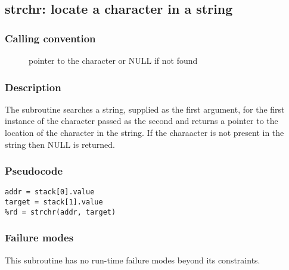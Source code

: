 \clearpage
{}
{}
\label{subr:strchr}
\subsection*{strchr: locate a character in a string}

\subsubsection*{Calling convention}

\begin{description}
\item[] pointer to the character or NULL if not found
\end{description}

\subsubsection*{Description}

The  subroutine searches a string, supplied as the
first argument, for the first instance of the character passed as the
second and returns a pointer to the location of the character in the
string.  If the charaacter is not present in the string then NULL is
returned.

\subsubsection*{Pseudocode}

\begin{verbatim}
addr = stack[0].value
target = stack[1].value
%rd = strchr(addr, target)
\end{verbatim}

\subsubsection*{Failure modes}

This subroutine has no run-time failure modes beyond its constraints.
